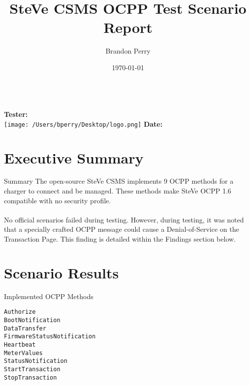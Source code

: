 \documentclass{scrartcl}
\title{SteVe CSMS OCPP Test Scenario Report}
\author{Brandon Perry}
\date{\today}
\begin{document}
\begin{titlepage}
    \centering
    \vspace*{1in}
    {\Huge \bfseries \thetitle}\\[2em]
    {\Large \textbf{Tester:} \theauthor}\\[4em]
    \texttt{[image: /Users/bperry/Desktop/logo.png]} %
    \vfill
    \vspace*{0.5in}
    {\large \textbf{Date: \thedate}}
\end{titlepage}

\tableofcontents
\newpage

\section*{Executive Summary}
\begin{sectionbox}[colback=yellow!10!white]{Summary}
The open-source SteVe CSMS implements 9 OCPP methods for a charger to connect and be managed. These methods make SteVe OCPP 1.6 compatible with no security profile.
\\
\\
No official scenarios failed during testing. However, during testing, it was noted that a specially crafted OCPP message could cause a Denial-of-Service on the Transaction Page. This finding is detailed within the Findings section below.
\end{sectionbox}
\newpage

\section*{Scenario Results}
\begin{sectionbox}{Implemented OCPP Methods}
  \begin{verbatim}
Authorize
BootNotification
DataTransfer
FirmwareStatusNotification
Heartbeat
MeterValues
StatusNotification
StartTransaction
StopTransaction
\end{verbatim}
\end{sectionbox}
\end{document}
